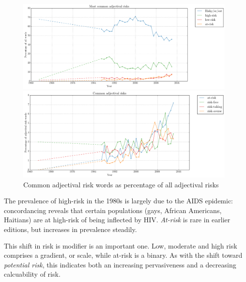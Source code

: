             \noindent
          \begin{figure}[htb!]
          \centering
          \begin{minipage}{.48\textwidth}
            \centering
            \includegraphics[width=0.98\textwidth]{../images/most_common_adjectival_risks.png}
          \end{minipage}%
          \begin{minipage}{.48\textwidth}
            \centering
            \includegraphics[width=0.98\textwidth]{../images/common_adjectival_risks.png}
           \end{minipage}
           \caption{Common adjectival risk words as percentage of all adjectival risks}
                \label{fig:adjtraj}
          \end{figure}


			The prevalence of high-risk in the 1980s is largely due to the AIDS epidemic: concordancing reveals that certain populations (gays, African Americans, Haitians) are at high-risk of being inflected by HIV. \emph{At-risk} is rare in earlier editions, but increases in prevalence steadily.

			This shift in risk is modifier is an important one. Low, moderate and high risk comprises a gradient, or scale, while at-risk is a binary. As with the shift toward \emph{potential risk}, this indicates both an increasing pervasiveness and a decreasing calcuability of risk. %
			
